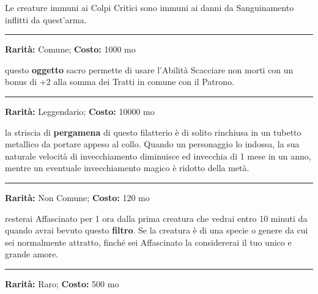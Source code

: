 \begin{multicols}{2}
Le creature immuni ai Colpi Critici sono immuni ai danni da Sanguinamento inflitti da quest'arma.

\smallskip\noindent\rule{\linewidth}{2pt}  \hypertarget{Filatteriocontroinonmorti}{}\smallskip{}\noindent\label{Filatteriocontroinonmorti}

\textbf{Rarità:} Comune; \textbf{Costo:} 1000 mo

questo \textbf{oggetto} sacro permette di usare l'Abilità Scacciare non morti con un bonus di +2 alla somma dei Tratti in comune con il Patrono.

\smallskip\noindent\rule{\linewidth}{2pt}  \hypertarget{Filatteriodellagiovinezza}{}\smallskip{}\noindent\label{Filatteriodellagiovinezza}

\textbf{Rarità:} Leggendario; \textbf{Costo:} 10000 mo

la striscia di \textbf{pergamena} di questo filatterio è di solito rinchiusa in un tubetto metallico da portare appeso al collo. Quando un personaggio lo indossa, la sua naturale velocità di invecchiamento diminuisce ed invecchia di 1 mese in un anno, mentre un eventuale invecchiamento magico è ridotto della metà.

\smallskip\noindent\rule{\linewidth}{2pt}  \hypertarget{Filtrod'Amore}{}\smallskip{}\noindent\label{Filtrod'Amore}

\textbf{Rarità:} Non Comune; \textbf{Costo:} 120 mo

resterai Affascinato per 1 ora dalla prima creatura che vedrai entro 10 minuti da quando avrai bevuto questo \textbf{filtro}. Se la creatura è di una specie o genere da cui sei normalmente attratto, finché sei Affascinato la considererai il tuo unico e grande amore.

\smallskip\noindent\rule{\linewidth}{2pt}  \hypertarget{FiltroScopritesori}{}\smallskip{}\noindent\label{FiltroScopritesori}

\textbf{Rarità:} Raro; \textbf{Costo:} 500 mo


\end{multicols}
